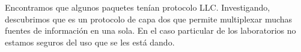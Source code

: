 



Encontramos que algunos paquetes tenían protocolo LLC. Investigando, descubrimos
que es un protocolo de capa dos que permite multiplexar muchas fuentes de
información en una sola. En el caso particular de los laboratorios no
estamos seguros del uso que se les está dando.


